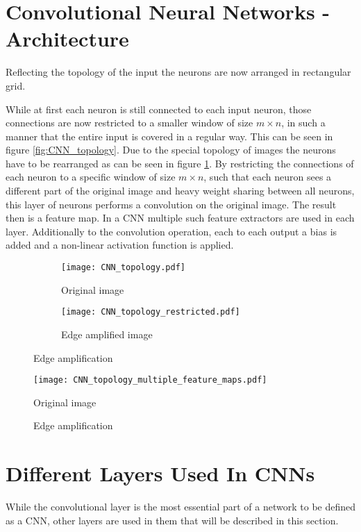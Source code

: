 \section{Convolutional Neural Networks - Architecture}

Reflecting the topology of the input the neurons are now arranged in rectangular grid. 




While at first each neuron is still connected to each input neuron, those connections are now restricted to a smaller window of size $m\times n$, in such a manner that the entire input is covered in a regular way. This can be seen in figure \ref{fig:CNN_topology}.
Due to the special topology of images the neurons have to be rearranged as can be seen in figure \ref{fig:CNN_topology_notrestricted}. By restricting the connections of each neuron to a specific window of size $m\times n$, such that each neuron sees a different part of the original image and heavy weight sharing between all neurons, this layer of neurons performs a convolution on the original image. The result then is a feature map. In a CNN multiple such feature extractors are used in each layer. Additionally to the convolution operation, each to each output a bias is added and a non-linear activation function is applied.\\
\begin{figure}
\centering
\begin{subfigure}{.5\textwidth}
  \centering
  \texttt{[image: CNN\_topology.pdf]}
  \caption{Original image}
  \label{fig:CNN_topology_notrestricted}
\end{subfigure}%
\begin{subfigure}{.5\textwidth}
  \centering
  \texttt{[image: CNN\_topology\_restricted.pdf]}
  \caption{Edge amplified image}
  \label{fig:sub2}
\end{subfigure}
\caption{Edge amplification}
\label{fig:Sobel}
\end{figure}


\begin{figure}
\texttt{[image: CNN\_topology\_multiple\_feature\_maps.pdf]}
  \caption{Original image}
  \label{fig:CNN_topology_notrestricted}
\caption{Edge amplification}
\label{fig:Sobel}
\end{figure}

\section{Different Layers Used In CNNs}
While the convolutional layer is the most essential part of a network to be defined as a CNN, other layers are used in them that will be described in this section.

